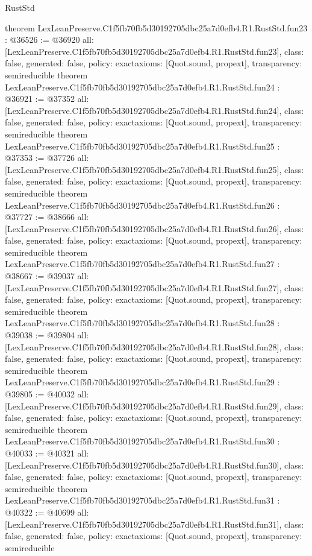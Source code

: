 \begin{lexlean}{RustStd}
\begin{coremodule}
{}
theorem LexLeanPreserve.C1f5fb70fb5d30192705dbc25a7d0efb4.R1.RustStd.fun23 : @36526 := @36920 {
  all: [LexLeanPreserve.C1f5fb70fb5d30192705dbc25a7d0efb4.R1.RustStd.fun23],
  class: false,
  generated: false,
  policy: exact{axioms: [Quot.sound, propext]},
  transparency: semireducible
}
theorem LexLeanPreserve.C1f5fb70fb5d30192705dbc25a7d0efb4.R1.RustStd.fun24 : @36921 := @37352 {
  all: [LexLeanPreserve.C1f5fb70fb5d30192705dbc25a7d0efb4.R1.RustStd.fun24],
  class: false,
  generated: false,
  policy: exact{axioms: [Quot.sound, propext]},
  transparency: semireducible
}
theorem LexLeanPreserve.C1f5fb70fb5d30192705dbc25a7d0efb4.R1.RustStd.fun25 : @37353 := @37726 {
  all: [LexLeanPreserve.C1f5fb70fb5d30192705dbc25a7d0efb4.R1.RustStd.fun25],
  class: false,
  generated: false,
  policy: exact{axioms: [Quot.sound, propext]},
  transparency: semireducible
}
theorem LexLeanPreserve.C1f5fb70fb5d30192705dbc25a7d0efb4.R1.RustStd.fun26 : @37727 := @38666 {
  all: [LexLeanPreserve.C1f5fb70fb5d30192705dbc25a7d0efb4.R1.RustStd.fun26],
  class: false,
  generated: false,
  policy: exact{axioms: [Quot.sound, propext]},
  transparency: semireducible
}
theorem LexLeanPreserve.C1f5fb70fb5d30192705dbc25a7d0efb4.R1.RustStd.fun27 : @38667 := @39037 {
  all: [LexLeanPreserve.C1f5fb70fb5d30192705dbc25a7d0efb4.R1.RustStd.fun27],
  class: false,
  generated: false,
  policy: exact{axioms: [Quot.sound, propext]},
  transparency: semireducible
}
theorem LexLeanPreserve.C1f5fb70fb5d30192705dbc25a7d0efb4.R1.RustStd.fun28 : @39038 := @39804 {
  all: [LexLeanPreserve.C1f5fb70fb5d30192705dbc25a7d0efb4.R1.RustStd.fun28],
  class: false,
  generated: false,
  policy: exact{axioms: [Quot.sound, propext]},
  transparency: semireducible
}
theorem LexLeanPreserve.C1f5fb70fb5d30192705dbc25a7d0efb4.R1.RustStd.fun29 : @39805 := @40032 {
  all: [LexLeanPreserve.C1f5fb70fb5d30192705dbc25a7d0efb4.R1.RustStd.fun29],
  class: false,
  generated: false,
  policy: exact{axioms: [Quot.sound, propext]},
  transparency: semireducible
}
theorem LexLeanPreserve.C1f5fb70fb5d30192705dbc25a7d0efb4.R1.RustStd.fun30 : @40033 := @40321 {
  all: [LexLeanPreserve.C1f5fb70fb5d30192705dbc25a7d0efb4.R1.RustStd.fun30],
  class: false,
  generated: false,
  policy: exact{axioms: [Quot.sound, propext]},
  transparency: semireducible
}
theorem LexLeanPreserve.C1f5fb70fb5d30192705dbc25a7d0efb4.R1.RustStd.fun31 : @40322 := @40699 {
  all: [LexLeanPreserve.C1f5fb70fb5d30192705dbc25a7d0efb4.R1.RustStd.fun31],
  class: false,
  generated: false,
  policy: exact{axioms: [Quot.sound, propext]},
  transparency: semireducible
}
\end{coremodule}
\end{lexlean}
